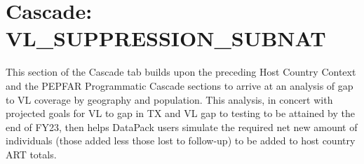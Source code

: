 \documentclass[
  openany]{book}
\begin{document}
\hypertarget{cascade-vl_suppression_subnat}{%
\section{Cascade: VL\_SUPPRESSION\_SUBNAT}\label{cascade-vl_suppression_subnat}}

\begin{table}
\centering\begingroup\fontsize{12}{14}\selectfont

\endgroup{}
\end{table}

This section of the Cascade tab builds upon the preceding Host Country
Context and the PEPFAR Programmatic Cascade sections to arrive at an
analysis of gap to VL coverage by geography and population. This
analysis, in concert with projected goals for VL to gap in TX and VL gap
to testing to be attained by the end of FY23, then helps DataPack users
simulate the required net new amount of individuals (those added less
those lost to follow-up) to be added to host country ART totals.
\end{document}

